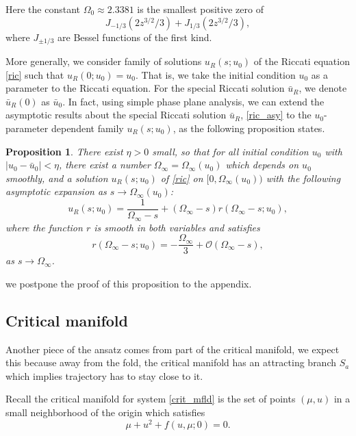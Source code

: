 \documentclass[letterpaper,11pt]{article}
\newcommand{\rmO}{\mathcal{O}}
\numberwithin{equation}{section}
\theoremstyle{plain}
\newtheorem{proposition}[theorem]{Proposition}
\begin{document}
Here the constant $\Omega_0 \approx 2.3381$ is the smallest positive zero of 
\[
J_{-1/3}(2z^{3/2}/3)+J_{1/3}(2z^{3/2}/3),
\]
where $J_{\pm 1/3}$ are Bessel functions of the first kind.


More generally, we consider family of solutions  $u_R(s; u_0)$ of the Riccati equation  \eqref{ric} such that $u_R(0; u_0) = u_0$. That is, we take the initial condition $u_0$ as a parameter to the Riccati equation. For the special Riccati solution $\bar{u}_R$, we denote $\bar{u}_R(0) $ as $\bar{u}_0$. In fact, using simple phase plane analysis, we can extend the asymptotic results about the special Riccati solution $\bar{u}_R$, \eqref{ric_asy} to the $u_0$-parameter dependent family $u_R(s; u_0)$, as the following proposition states.

\begin{proposition}\label{para_ric}
There exist $\eta>0$ small, so that for all initial condition $u_0$ with $|u_0- \bar{u}_0|<\eta$, there exist a number $\Omega_\infty=\Omega_\infty(u_0)$ which depends on $u_0$ smoothly, and a solution $u_R(s;u_0)$ of \eqref{ric} on $[0, \Omega_\infty(u_0))$ with the following asymptotic expansion as $s\to \Omega_\infty(u_0)$:
\begin{equation}\label{ric_exp}
u_R(s;u_0) = \frac{1}{\Omega_\infty-s} +  (\Omega_\infty-s) r(\Omega_\infty-s;u_0),
\end{equation}
where the function $r$ is smooth in both variables and satisfies
\begin{equation}\label{ric_reminder}
r( \Omega_\infty-s; u_0) = -\frac{\Omega_\infty}{3} + \rmO(\Omega_\infty-s),
\end{equation}
as $s \to \Omega_\infty$.
\end{proposition}
we postpone the proof of this proposition to the appendix.
\subsection{Critical manifold}\label{c_mfld}
Another piece of the ansatz comes from part of  the critical manifold, we expect this because away from the fold, the critical manifold has an attracting branch $S_a$ which implies trajectory has to stay close to it. 

Recall the critical manifold for system \eqref{crit_mfld} is the set of points $(\mu, u) $ in a small neighborhood of the origin which satisfies
\begin{equation} \label{crit_mfld}
\mu + u^2 + f(u,\mu; 0) =  0.
\end{equation}
\end{document}
